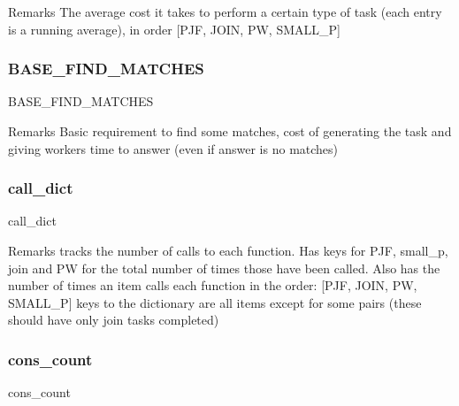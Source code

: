 \begin{DoxyRemark}{Remarks}
The average cost it takes to perform a certain type of task (each entry is a running average), in order \mbox{[}P\+JF, J\+O\+IN, PW, S\+M\+A\+L\+L\+\_\+P\mbox{]} 
\end{DoxyRemark}
\mbox{\label{classdynamicfilterapp_1_1models_1_1_join_a149aa51e1bac1266ca1f8e2eed2ca2ab}} 
\subsubsection{\texorpdfstring{BASE\_FIND\_MATCHES}{BASE\_FIND\_MATCHES}}
{\footnotesize\ttfamily B\+A\+S\+E\+\_\+\+F\+I\+N\+D\+\_\+\+M\+A\+T\+C\+H\+ES}

\begin{DoxyRemark}{Remarks}
Basic requirement to find some matches, cost of generating the task and giving workers time to answer (even if answer is no matches) 
\end{DoxyRemark}
\mbox{\label{classdynamicfilterapp_1_1models_1_1_join_af3dc8873acbdc1634b41af003969d465}} 
\subsubsection{\texorpdfstring{call\_dict}{call\_dict}}
{\footnotesize\ttfamily call\+\_\+dict}

\begin{DoxyRemark}{Remarks}
tracks the number of calls to each function. Has keys for P\+JF, small\+\_\+p, join and PW for the total number of times those have been called. Also has the number of times an item calls each function in the order\+: \mbox{[}P\+JF, J\+O\+IN, PW, S\+M\+A\+L\+L\+\_\+P\mbox{]} keys to the dictionary are all items except for some pairs (these should have only join tasks completed) 
\end{DoxyRemark}
\mbox{\label{classdynamicfilterapp_1_1models_1_1_join_ace3682116362edac4f94c633d82de3fb}} 
\subsubsection{\texorpdfstring{cons\_count}{cons\_count}}
{\footnotesize\ttfamily cons\+\_\+count}

